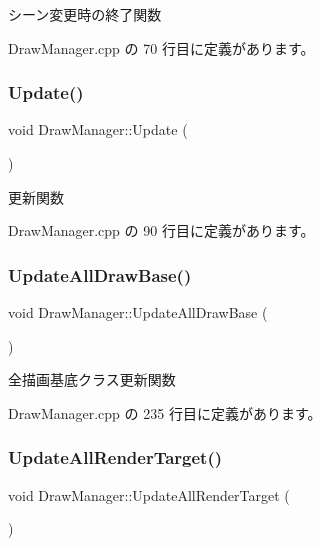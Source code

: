 シーン変更時の終了関数 



 Draw\+Manager.\+cpp の 70 行目に定義があります。

\mbox{\label{class_draw_manager_af498c44ff698bf3ef473df970e24c917}} 
\subsubsection{\texorpdfstring{Update()}{Update()}}
{\footnotesize\ttfamily void Draw\+Manager\+::\+Update (\begin{DoxyParamCaption}{ }\end{DoxyParamCaption})}



更新関数 



 Draw\+Manager.\+cpp の 90 行目に定義があります。

\mbox{\label{class_draw_manager_a7c989a2beae5de5a1fc7ab0bef8692f9}} 
\subsubsection{\texorpdfstring{Update\+All\+Draw\+Base()}{UpdateAllDrawBase()}}
{\footnotesize\ttfamily void Draw\+Manager\+::\+Update\+All\+Draw\+Base (\begin{DoxyParamCaption}{ }\end{DoxyParamCaption})\hspace{0.3cm}{\ttfamily [private]}}



全描画基底クラス更新関数 



 Draw\+Manager.\+cpp の 235 行目に定義があります。

\mbox{\label{class_draw_manager_a8eb2f1e3957113ae99e8240c40c89744}} 
\subsubsection{\texorpdfstring{Update\+All\+Render\+Target()}{UpdateAllRenderTarget()}}
{\footnotesize\ttfamily void Draw\+Manager\+::\+Update\+All\+Render\+Target (\begin{DoxyParamCaption}{ }\end{DoxyParamCaption})\hspace{0.3cm}{\ttfamily [private]}}



